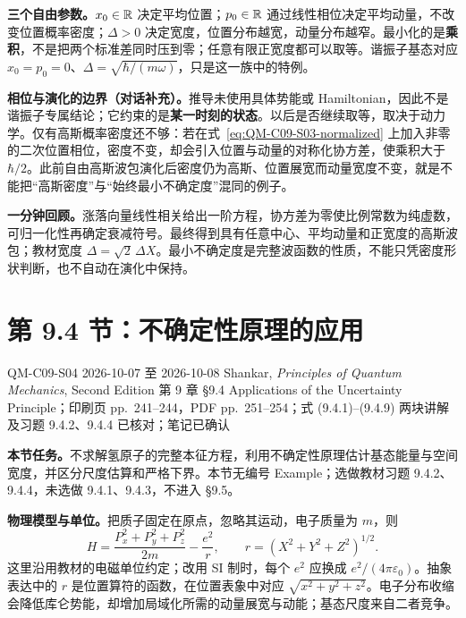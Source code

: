 \textbf{三个自由参数。}$x_0\in\mathbb{R}$ 决定平均位置；$p_0\in\mathbb{R}$ 通过线性相位决定平均动量，不改变位置概率密度；$\Delta>0$ 决定宽度，位置分布越宽，动量分布越窄。最小化的是\textbf{乘积}，不是把两个标准差同时压到零；任意有限正宽度都可以取等。谐振子基态对应 $x_0=p_0=0$、$\Delta=\sqrt{\hbar/(m\omega)}$，只是这一族中的特例。

\textbf{相位与演化的边界（对话补充）。}推导未使用具体势能或 Hamiltonian，因此不是谐振子专属结论；它约束的是\textbf{某一时刻的状态}。以后是否继续取等，取决于动力学。仅有高斯概率密度还不够：若在式~\eqref{eq:QM-C09-S03-normalized} 上加入非零的二次位置相位，密度不变，却会引入位置与动量的对称化协方差，使乘积大于 $\hbar/2$。此前自由高斯波包演化后密度仍为高斯、位置展宽而动量宽度不变，就是不能把“高斯密度”与“始终最小不确定度”混同的例子。

\textbf{一分钟回顾。}涨落向量线性相关给出一阶方程，协方差为零使比例常数为纯虚数，可归一化性再确定衰减符号。最终得到具有任意中心、平均动量和正宽度的高斯波包；教材宽度 $\Delta=\sqrt2\,\Delta X$。最小不确定度是完整波函数的性质，不能只凭密度形状判断，也不自动在演化中保持。

\section{第 9.4 节：不确定性原理的应用}
\label{section:QM-C09-S04}
\studymeta
  {QM-C09-S04}
  {2026-10-07 至 2026-10-08}
  {Shankar, \textit{Principles of Quantum Mechanics}, Second Edition}
  {第 9 章 \S 9.4 Applications of the Uncertainty Principle；印刷页 pp.~241--244，PDF pp.~251--254；式 (9.4.1)--(9.4.9)}
  {两块讲解及习题 9.4.2、9.4.4 已核对；笔记已确认}

\textbf{本节任务。}不求解氢原子的完整本征方程，利用不确定性原理估计基态能量与空间宽度，并区分尺度估算和严格下界。本节无编号 Example；选做教材习题 9.4.2、9.4.4，未选做 9.4.1、9.4.3，不进入 \S 9.5。

\textbf{物理模型与单位。}把质子固定在原点，忽略其运动，电子质量为 $m$，则
\begin{equation}
  H=\frac{P_x^2+P_y^2+P_z^2}{2m}-\frac{e^2}{r},
  \qquad r=(X^2+Y^2+Z^2)^{1/2}.
\end{equation}
这里沿用教材的电磁单位约定；改用 SI 制时，每个 $e^2$ 应换成 $e^2/(4\pi\varepsilon_0)$。抽象表达中的 $r$ 是位置算符的函数，在位置表象中对应 $\sqrt{x^2+y^2+z^2}$。电子分布收缩会降低库仑势能，却增加局域化所需的动量展宽与动能；基态尺度来自二者竞争。

